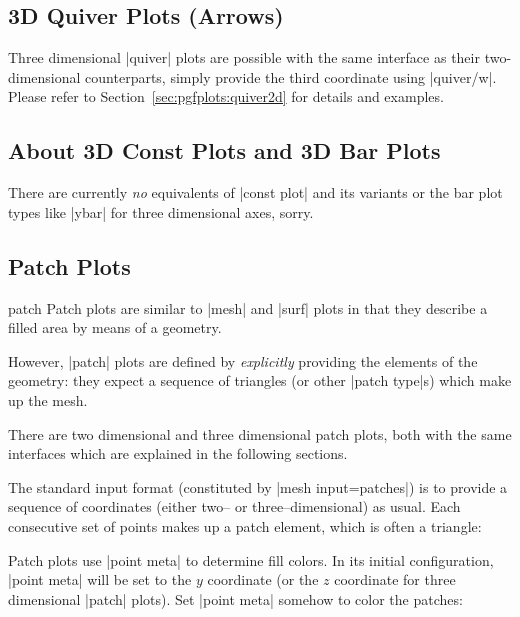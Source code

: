 {\subsection{3D Quiver Plots (Arrows)}
Three dimensional |quiver| plots are possible with the same interface as their two-dimensional counterparts, simply provide the third coordinate using |quiver/w|. Please refer to Section~\ref{sec:pgfplots:quiver2d} for details and examples.

\subsection{About 3D Const Plots and 3D Bar Plots}
There are currently \emph{no} equivalents of |const plot| and its variants or the bar plot types like |ybar| for three dimensional axes, sorry.

\subsection{Patch Plots}
\label{sec:pgfplots:3d:patch}
\begin{plottype}[/pgfplots]{patch}
	Patch plots are similar to |mesh| and |surf| plots in that they describe a filled area by means of a geometry.

	However, |patch| plots are defined by \emph{explicitly} providing the elements of the geometry: they expect a sequence of triangles (or other |patch type|s) which make up the mesh.

	There are two dimensional and three dimensional patch plots, both with the same interfaces which are explained in the following sections.

	The standard input format (constituted by |mesh input=patches|) is to provide a sequence of coordinates (either two-- or three--dimensional) as usual. Each consecutive set of points makes up a patch element, which is often a triangle:
\begin{codeexample}[]
\end{codeexample}
	\noindent Patch plots use |point meta| to determine fill colors. In its initial configuration, |point meta| will be set to the $y$ coordinate (or the $z$ coordinate for three dimensional |patch| plots). Set |point meta| somehow to color the patches:
\begin{codeexample}[]
\end{codeexample}
\end{plottype}}
